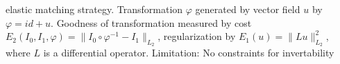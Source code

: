 {elastic matching strategy. Transformation $\varphi$ generated by vector field $u$ by $\varphi = id + u$. Goodness of transformation measured by cost $E_2(I_0, I_1, \varphi) = \|I_0\circ\varphi^{-1} - I_1\|_{L_2}$, regularization by $E_1(u) = \|Lu\|_{L_2}^2$, where $L$ is a differential operator. 
Limitation: No constraints for invertability }